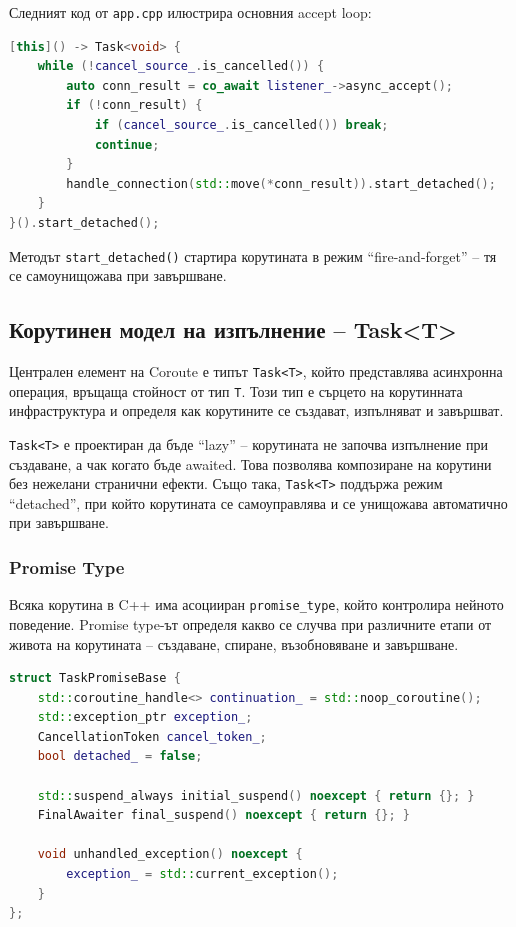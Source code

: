 Следният код от \texttt{app.cpp} илюстрира основния accept loop:

\begin{lstlisting}[language=C++, basicstyle=\small\ttfamily, caption={Основен accept loop}]
[this]() -> Task<void> {
    while (!cancel_source_.is_cancelled()) {
        auto conn_result = co_await listener_->async_accept();
        if (!conn_result) {
            if (cancel_source_.is_cancelled()) break;
            continue;
        }
        handle_connection(std::move(*conn_result)).start_detached();
    }
}().start_detached();
\end{lstlisting}

Методът \texttt{start\_detached()} стартира корутината в режим ``fire-and-forget'' -- тя се самоунищожава при завършване.

\subsection{Корутинен модел на изпълнение -- Task<T>}

Централен елемент на Coroute е типът \texttt{Task<T>}, който представлява асинхронна операция, връщаща стойност от тип \texttt{T}. Този тип е сърцето на корутинната инфраструктура и определя как корутините се създават, изпълняват и завършват.

\texttt{Task<T>} е проектиран да бъде ``lazy'' -- корутината не започва изпълнение при създаване, а чак когато бъде awaited. Това позволява композиране на корутини без нежелани странични ефекти. Също така, \texttt{Task<T>} поддържа режим ``detached'', при който корутината се самоуправлява и се унищожава автоматично при завършване.

\subsubsection{Promise Type}

Всяка корутина в C++ има асоцииран \texttt{promise\_type}, който контролира нейното поведение. Promise type-ът определя какво се случва при различните етапи от живота на корутината -- създаване, спиране, възобновяване и завършване.

\begin{lstlisting}[language=C++, basicstyle=\small\ttfamily, caption={TaskPromiseBase структура}]
struct TaskPromiseBase {
    std::coroutine_handle<> continuation_ = std::noop_coroutine();
    std::exception_ptr exception_;
    CancellationToken cancel_token_;
    bool detached_ = false;

    std::suspend_always initial_suspend() noexcept { return {}; }
    FinalAwaiter final_suspend() noexcept { return {}; }
    
    void unhandled_exception() noexcept {
        exception_ = std::current_exception();
    }
};
\end{lstlisting}

